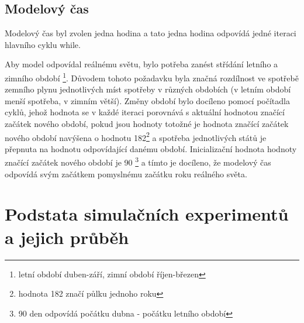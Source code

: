 \documentclass[a4paper,11pt]{article}
\begin{document}
\subsection{Modelový čas}

Modelový čas byl zvolen jedna hodina a tato jedna hodina odpovídá jedné iteraci hlavního cyklu while.

Aby model odpovídal reálnému světu, bylo potřeba zanést střídání letního a zimního období
\footnote{letní období duben-září, zimní období říjen-březen}.
Důvodem tohoto požadavku byla značná rozdílnost ve spotřebě zemního plynu jednotlivých míst spotřeby
v různých obdobích (v letním období menší spotřeba, v zimním větší).
Změny období bylo docíleno pomocí počítadla cyklů, jehož hodnota se v každé iteraci porovnává 
s aktuální hodnotou značící začátek nového období, pokud jsou hodnoty totožné 
je hodnota značící začátek nového období navýšena o hodnotu 182\footnote{hodnota 182 značí půlku jednoho roku}
a spotřeba jednotlivých států je přepnuta na hodnotu odpovídající danému období.
Inicializační hodnota hodnoty značící začátek nového období je 90 \footnote{90 den odpovídá počátku dubna - počátku letního období}
a tímto je docíleno,
že modelový čas odpovídá svým začátkem pomyslnému začátku roku reálného světa.

\section{Podstata simulačních experimentů a jejich průběh}
\end{document}
